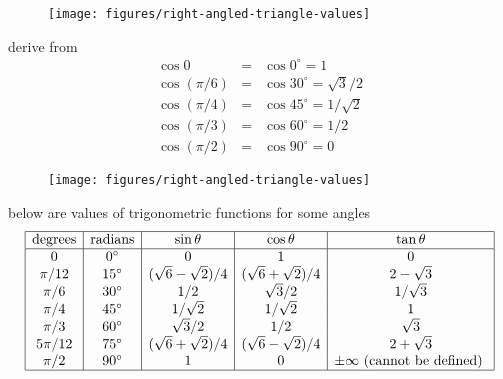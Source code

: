 \documentclass[17pt,landscape]{foils}
\begin{document}
\eit
\begin{figure}
\begin{center}
\texttt{[image: figures/right-angled-triangle-values]}
\label{fig:triangles for special values of sin}
\end{center}
\end{figure}
\bit
\item
derive from 
\begin{eqnarray*}
\cos 0 &=& \cos 0^\circ = 1
\\
\cos ({\pi}/{6}) &=& \cos 30^\circ = \sqrt{3}/2
\\
\cos ({\pi}/{4}) &=& \cos 45^\circ = 1/\sqrt{2}
\\
\cos ({\pi}/{3}) &=& \cos 60^\circ = {1}/{2}
\\
\cos ({\pi}/{2}) &=& \cos 90^\circ = 0
\end{eqnarray*}
\eit
\begin{figure}
\begin{center}
\texttt{[image: figures/right-angled-triangle-values]}
\label{fig:triangles for special values of cos}
\end{center}
\end{figure}
\bit
\item
below are values of trigonometric functions
for some angles
\[
\begin{array}{|c|c|c|c|c|}
\hline
\mbox{degrees} & \mbox{radians} & \sin\theta & \cos\theta & \tan\theta
\\
\hline
0 & 0^\circ & 0 & 1 & 0
\\
\pi/12 & 15^\circ & (\sqrt{6} - \sqrt{2})/4 & (\sqrt{6}+\sqrt{2})/4 & 2-\sqrt{3}
\\
\pi/6 & 30^\circ & 1/2 & \sqrt{3}/2 & 1/\sqrt{3}
\\
\pi/4 & 45^\circ & 1/\sqrt{2} & 1/\sqrt{2} & 1
\\
\pi/3 & 60^\circ & \sqrt{3}/2 & 1/2 & \sqrt{3}
\\
5\pi/12 & 75^\circ & (\sqrt{6} + \sqrt{2})/4 & (\sqrt{6}-\sqrt{2})/4 & 2+\sqrt{3}
\\
\pi/2 & 90^\circ & 1 & 0 & \pm \infty\mbox{ (cannot be defined)
}
\\
\hline
\end{array}
\]
\end{document}
